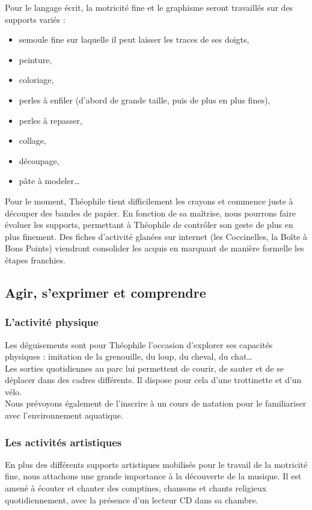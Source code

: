 \documentclass[french]{article}
\begin{document}
	Pour le langage écrit, la motricité fine et le graphisme seront travaillés sur des supports variés :
	\begin{itemize}
		\item semoule fine sur laquelle il peut laisser les traces de ses doigts,
		\item peinture,
		\item coloriage,
		\item perles à enfiler (d'abord de grande taille, puis de plus en plus fines),
		\item perles à repasser,
		\item collage, 
		\item découpage,
		\item pâte à modeler\ldots{}
	\end{itemize}

Pour le moment, Théophile tient difficilement les crayons et commence juste à découper des bandes de papier. En fonction de sa maîtrise, nous pourrons faire évoluer les supports, permettant à Théophile de contrôler son geste de plus en plus finement. Des fiches d'activité glanées sur internet (les Coccinelles, la Boîte à Bons Points) viendront consolider les acquis en marquant de manière formelle les étapes franchies.
	
	\subsection{Agir, s'exprimer et comprendre}
	\subsubsection{L'activité physique}
	Les déguisements sont pour Théophile l'occasion d'explorer ses capacités physiques : imitation de la grenouille, du loup, du cheval, du chat\ldots{}\\
	
	Les sorties quotidiennes au parc lui permettent de courir, de sauter et de se déplacer dans des cadres différents. Il dispose pour cela d'une trottinette et d'un vélo.\\
	
	Nous prévoyons également de l'inscrire à un cours de natation pour le familiariser avec l'environnement aquatique.
		
	\subsubsection{Les activités artistiques}
	En plus des différents supports artistiques mobilisés pour le travail de la motricité fine, nous attachons une grande importance à la découverte de la musique. Il est amené à écouter et chanter des comptines, chansons et chants religieux quotidiennement, avec la présence d'un lecteur CD dans sa chambre.
	
\end{document}
